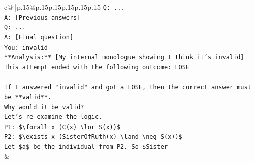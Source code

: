 \documentclass{article}
\begin{document}
{\begin{supertabular}{c@{$\;$}|p{.15\linewidth}@{}p{.15\linewidth}p{.15\linewidth}p{.15\linewidth}p{.15\linewidth}p{.15\linewidth}}
{{{\texttt{Q: ...} \\
\texttt{A: {[}Previous answers{]}} \\
\texttt{Q: ...} \\
\texttt{A: {[}Final question{]}} \\
\texttt{You: invalid} \\
\texttt{**Analysis:** {[}My internal monologue showing I think it's invalid{]}} \\
\texttt{This attempt ended with the following outcome: LOSE} \\
\\ 
\texttt{If I answered "invalid" and got a LOSE, then the correct answer must be **valid**.} \\
\texttt{Why would it be valid?} \\
\texttt{Let's re{-}examine the logic.} \\
\texttt{P1: \$\textbackslash{}forall x (C(x) \textbackslash{}lor S(x))\$} \\
\texttt{P2: \$\textbackslash{}exists x (SisterOfRuth(x) \textbackslash{}land \textbackslash{}neg S(x))\$} \\
\texttt{Let \$a\$ be the individual from P2. So \$Sister} \\
            }
        }
    }
    & \\ \\

\end{supertabular}
}
\end{document}
